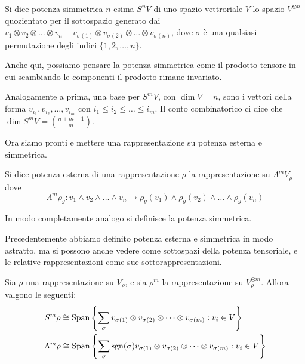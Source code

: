 \documentclass[a4paper,10pt,oneside]{math_article}
\newcommand{\tensor}{\otimes}
\begin{document}
    \begin{mydef}
      Si dice potenza simmetrica $n$-esima $S^nV$  di uno spazio vettroriale $V$ lo spazio $V^{\tensor n}$ quozientato per il sottospazio generato dai $v_1 \tensor v_2 \tensor \dots \tensor v_n - v_{\sigma(1)} \tensor v_{\sigma(2)} \tensor \dots \tensor v_{\sigma(n)}$, dove $\sigma$ è una qualsiasi permutazione degli indici $\{1,2,\dots,n\}$.  
    \end{mydef}

    Anche qui, possiamo pensare la potenza simmetrica come il prodotto tensore in cui scambiando le componenti il prodotto rimane invariato.
    
    Analogamente a prima, una base per $S^mV$, con $\dim V=n$, sono i vettori della forma  $v_{i_1},v_{i_2},\dots,v_{i_m}$ con $i_1\le i_2\le \dots \le i_m$. Il conto combinatorico ci dice che $\dim S^mV = \binom{n+m-1}m$.

    
    Ora siamo pronti e mettere una rappresentazione su potenza esterna e simmetrica.
    
    
    
    \begin{mydef}
     Si dice potenza esterna di una rappresentazione $\rho$ la rappresentazione su $\Lambda^m V_\rho$ dove
     \[
      \Lambda^m\rho_g: v_1 \wedge v_2 \wedge \dots \wedge v_n \mapsto \rho_g(v_1) \wedge \rho_g(v_2) \wedge \dots \wedge \rho_g(v_n)
     \]
     
     In modo completamente analogo si definisce la potenza simmetrica.

    \end{mydef}
    
    Precedentemente abbiamo definito potenza esterna e simmetrica in modo astratto, ma si possono anche vedere come sottospazi della potenza tensoriale, e le relative rappresentazioni come sue sottorappresentazioni.
    
    \begin{myprop}
     Sia $\rho$ una rappresentazione su $V_\rho$, e sia $\rho^m$ la rappresentazione su $V_\rho^{\tensor m}$. Allora valgono le seguenti: 
     \begin{eqnarray*}
      &S^m\rho \isom \Span{\left\{\sum_\sigma v_{\sigma(1)}\tensor v_{\sigma(2)} \tensor \dots \tensor v_{\sigma(m)}:v_i \in V\right\}}\\
      &\Lambda^m\rho \isom \Span{\left\{\sum_\sigma \sgn(\sigma) v_{\sigma(1)}\tensor v_{\sigma(2)} \tensor \dots \tensor v_{\sigma(m)}:v_i \in V\right\}} 
     \end{eqnarray*}

    \end{myprop}
\end{document}
